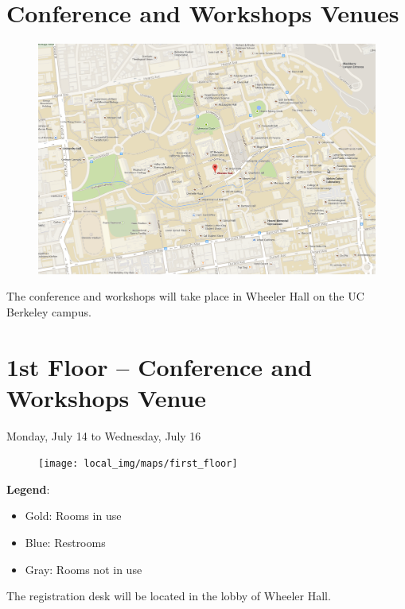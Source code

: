 \clearpage
{} \section{Conference and Workshops Venues}
\begin{figure}[h!]
\includegraphics[width=\linewidth]{local_img/maps/wheeler_hall}
\end{figure}
\vspace{0.3cm}
{\Large The conference and workshops will take place in Wheeler Hall on the UC Berkeley campus.}

\newpage
{} \section{1st Floor -- Conference and Workshops Venue}
{\large Monday, July 14 to Wednesday, July 16}
\begin{figure}[h!]
\center
\texttt{[image: local\_img/maps/first\_floor]}
\end{figure}

\vspace{0.3cm}

{\Large \textbf{Legend}: 
\begin{itemize}
\itemsep0em 
\item Gold: Rooms in use 
\item Blue: Restrooms
\item Gray: Rooms not in use
\end{itemize}
}

\vspace{0.3cm}
{\Large The registration desk will be located in the lobby of Wheeler Hall.}

